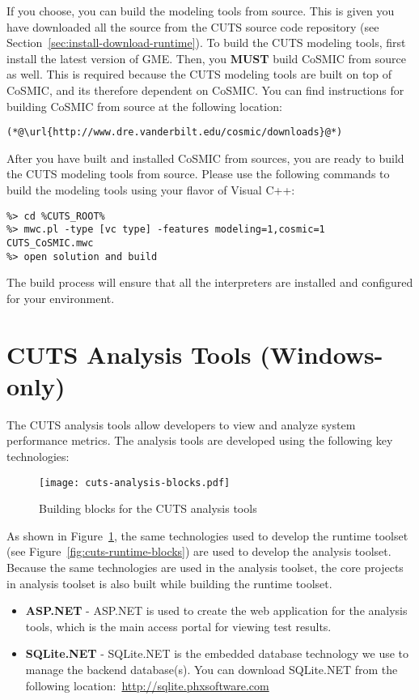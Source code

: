 If you choose, you can build the modeling tools from source. This is given you
have downloaded all the source from the CUTS source code repository (see 
Section~\ref{sec:install-download-runtime}). To build the CUTS modeling tools,
first install the latest version of GME. Then, you \textbf{MUST} build CoSMIC
from source as well. This is required because the CUTS modeling tools are
built on top of CoSMIC, and its therefore dependent on CoSMIC. You can find
instructions for building CoSMIC from source at the following location:
\begin{lstlisting}
(*@\url{http://www.dre.vanderbilt.edu/cosmic/downloads}@*)
\end{lstlisting}
After you have built and installed CoSMIC from sources, you are ready to build
the CUTS modeling tools from source. Please use the following commands to 
build the modeling tools using your flavor of Visual C++:
\begin{lstlisting}
%> cd %CUTS_ROOT%
%> mwc.pl -type [vc type] -features modeling=1,cosmic=1 CUTS_CoSMIC.mwc
%> open solution and build
\end{lstlisting}
The build process will ensure that all the interpreters are installed
and configured for your environment.

\section{CUTS Analysis Tools (Windows-only)}

The CUTS analysis tools allow developers to view and analyze system
performance metrics. The analysis tools are developed using the following
key technologies:
\begin{figure}[htbp]
  \centering
  \texttt{[image: cuts-analysis-blocks.pdf]}
  \caption{Building blocks for the CUTS analysis tools}
  \label{fig:cuts-analysis-blocks}
\end{figure}

As shown in Figure~\ref{fig:cuts-analysis-blocks}, the same technologies 
used to develop the runtime toolset (see Figure~\ref{fig:cuts-runtime-blocks}) 
are used to develop the analysis toolset. Because the same technologies 
are used in the analysis toolset, the core projects in analysis toolset 
is also built while building the runtime toolset.
\iffalse
\begin{itemize}
  \item \textbf{ASP.NET} - ASP.NET is used to create the web application
  for the analysis tools, which is the main access portal for viewing 
  test results.

  \item \textbf{SQLite.NET} - SQLite.NET is the embedded database technology
  we use to manage the backend database(s). You can download SQLite.NET
  from the following location:~\url{http://sqlite.phxsoftware.com}
\end{itemize}

